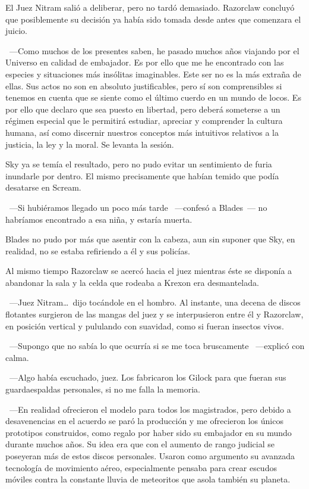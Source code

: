 El Juez Nitram salió a deliberar, pero no tardó demasiado. Razorclaw concluyó que posiblemente su decisión ya había sido tomada desde antes que comenzara el juicio.

~---Como muchos de los presentes saben, he pasado muchos años viajando por el Universo en calidad de embajador. Es por ello que me he encontrado con las especies y situaciones más insólitas imaginables. Este ser no es la más extraña de ellas. Sus actos no son en absoluto justificables, pero sí son comprensibles si tenemos en cuenta que se siente como el último cuerdo en un mundo de locos. Es por ello que declaro que sea puesto en libertad, pero deberá someterse a un régimen especial que le permitirá estudiar, apreciar y comprender la cultura humana, así como discernir nuestros conceptos más intuitivos relativos a la justicia, la ley y la moral. Se levanta la sesión.

Sky ya se temía el resultado, pero no pudo evitar un sentimiento de furia inundarle por dentro. El mismo precisamente que habían temido que podía desatarse en Scream.

~---Si hubiéramos llegado un poco más tarde ~---confesó a Blades~--- no habríamos encontrado a esa niña, y estaría muerta.

Blades no pudo por más que asentir con la cabeza, aun sin suponer que Sky, en realidad, no se estaba refiriendo a él y sus policías.

Al mismo tiempo Razorclaw se acercó hacia el juez mientras éste se disponía a abandonar la sala y la celda que rodeaba a Krexon era desmantelada.

~---Juez Nitram\dots\ dijo tocándole en el hombro. Al instante, una decena de discos flotantes surgieron de las mangas del juez y se interpusieron entre él y Razorclaw, en posición vertical y pululando con suavidad, como si fueran insectos vivos.

~---Supongo que no sabía lo que ocurría si se me toca bruscamente ~---explicó con calma.

~---Algo había escuchado, juez. Los fabricaron los Gilock para que fueran sus guardaespaldas personales, si no me falla la memoria.

~---En realidad ofrecieron el modelo para todos los magistrados, pero debido a desavenencias en el acuerdo se paró la producción y me ofrecieron los únicos prototipos construidos, como regalo por haber sido su embajador en su mundo durante muchos años. Su idea era que con el aumento de rango judicial se poseyeran más de estos discos personales. Usaron como argumento su avanzada tecnología de movimiento aéreo, especialmente pensaba para crear escudos móviles contra la constante lluvia de meteoritos que asola también su planeta.

